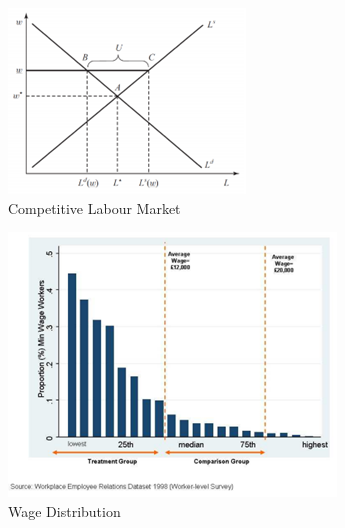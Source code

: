 \documentclass[12pt]{article}
\begin{document}
\begin{figure}
	\centering 
	\includegraphics{NC}
	\caption{Competitive Labour Market}
\end{figure} 

\begin{figure}
	\centering
	\includegraphics{NC1}
	\caption{Wage Distribution}
\end{figure} 
\end{document}
